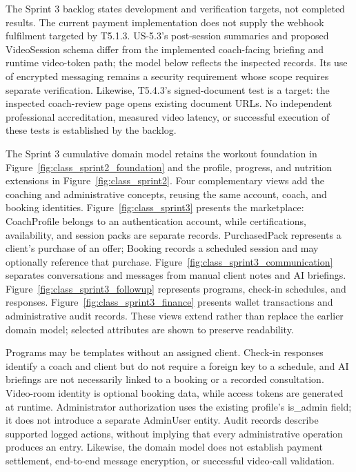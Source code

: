 \documentclass[12pt,a4paper,openany]{report}
\begin{document}
The Sprint 3 backlog states development and verification targets, not completed results. The current payment implementation does not supply the webhook fulfilment targeted by T5.1.3. US-5.3's post-session summaries and proposed VideoSession schema differ from the implemented coach-facing briefing and runtime video-token path; the model below reflects the inspected records. Its use of encrypted messaging remains a security requirement whose scope requires separate verification. Likewise, T5.4.3's signed-document test is a target: the inspected coach-review page opens existing document URLs. No independent professional accreditation, measured video latency, or successful execution of these tests is established by the backlog.

The Sprint 3 cumulative domain model retains the workout foundation in Figure~\ref{fig:class_sprint2_foundation} and the profile, progress, and nutrition extensions in Figure~\ref{fig:class_sprint2}. Four complementary views add the coaching and administrative concepts, reusing the same account, coach, and booking identities. Figure~\ref{fig:class_sprint3} presents the marketplace: CoachProfile belongs to an authentication account, while certifications, availability, and session packs are separate records. PurchasedPack represents a client's purchase of an offer; Booking records a scheduled session and may optionally reference that purchase. Figure~\ref{fig:class_sprint3_communication} separates conversations and messages from manual client notes and AI briefings. Figure~\ref{fig:class_sprint3_followup} represents programs, check-in schedules, and responses. Figure~\ref{fig:class_sprint3_finance} presents wallet transactions and administrative audit records. These views extend rather than replace the earlier domain model; selected attributes are shown to preserve readability.

Programs may be templates without an assigned client. Check-in responses identify a coach and client but do not require a foreign key to a schedule, and AI briefings are not necessarily linked to a booking or a recorded consultation. Video-room identity is optional booking data, while access tokens are generated at runtime. Administrator authorization uses the existing profile's is\_admin field; it does not introduce a separate AdminUser entity. Audit records describe supported logged actions, without implying that every administrative operation produces an entry. Likewise, the domain model does not establish payment settlement, end-to-end message encryption, or successful video-call validation.
\end{document}
